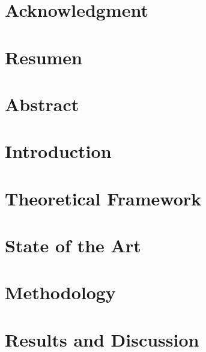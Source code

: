 \documentclass[12pt, twoside]{book}
\begin{document}
\chapter{\centering Acknowledgment}
\label{chap:acknowledgments}


\chapter{\centering Resumen}
\label{chap:resumen}


\chapter{\centering Abstract}
\label{chap:abstract}


\tableofcontents 
\printglossaries
\listoftables
\listoffigures




\mainmatter

\newpage

\chapter{Introduction}
\label{chap:intro}


\chapter{Theoretical Framework}
\label{chap:theory}


\chapter{State of the Art}
\label{chap:state_of_art}


%

\chapter{Methodology}
\label{chap:methods}


\chapter{Results and Discussion}
\label{chap:results}

\end{document}
